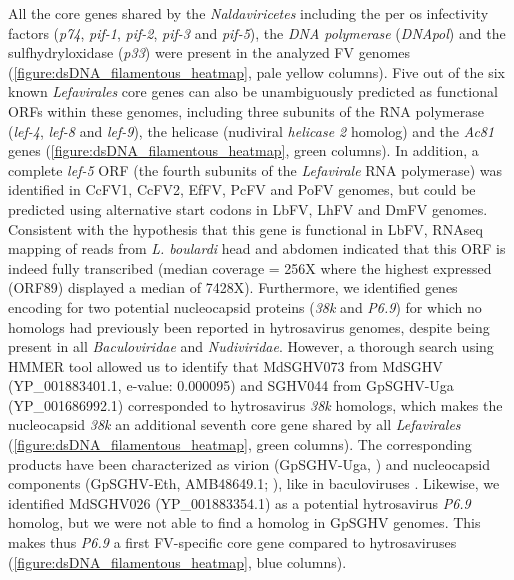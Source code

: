 All the core genes shared by the \textit{Naldaviricetes} including the per os infectivity factors (\textit{p74}, \textit{pif-1}, \textit{pif-2}, \textit{pif-3} and \textit{pif-5}), the \textit{DNA polymerase} (\textit{DNApol}) and the sulfhydryloxidase (\textit{p33}) were present in the analyzed FV genomes (\figurename{\ref{figure:dsDNA_filamentous_heatmap}}, pale yellow columns). Five out of the six known \textit{Lefavirales} core genes can also be unambiguously predicted as functional ORFs within these genomes, including three subunits of the RNA polymerase (\textit{lef-4}, \textit{lef-8} and \textit{lef-9}), the helicase (nudiviral \textit{helicase 2} homolog) and the \textit{Ac81} genes (\figurename{\ref{figure:dsDNA_filamentous_heatmap}}, green columns). In addition, a complete \textit{lef-5} ORF (the fourth subunits of the \textit{Lefavirale} RNA polymerase) was identified in CcFV1, CcFV2, EfFV, PcFV and PoFV genomes, but could be predicted using alternative start codons in LbFV, LhFV and DmFV genomes. Consistent with the hypothesis that this gene is functional in LbFV, RNAseq mapping of reads from \textit{L. boulardi} head and abdomen \citep{varaldi_deciphering_2018} indicated that this ORF is indeed fully transcribed (median coverage = 256X where the highest expressed (ORF89) displayed a median of 7428X). Furthermore, we identified genes encoding for two potential nucleocapsid proteins (\textit{38k} and \textit{P6.9}) for which no homologs had previously been reported in hytrosavirus genomes, despite being present in all \textit{Baculoviridae} and \textit{Nudiviridae}. However, a thorough search using HMMER tool allowed us to identify that MdSGHV073 from MdSGHV (YP\_001883401.1, e-value: 0.000095) and SGHV044 from GpSGHV-Uga (YP\_001686992.1) corresponded to hytrosavirus \textit{38k} homologs, which makes the nucleocapsid \textit{38k} an additional seventh core gene shared by all \textit{Lefavirales} (\figurename{\ref{figure:dsDNA_filamentous_heatmap}}, green columns).  The corresponding products have been characterized as virion (GpSGHV-Uga, \citep{kariithi_proteomic_2010}) and nucleocapsid components (GpSGHV-Eth, AMB48649.1; \citep{abd-alla_comprehensive_2016}), like in baculoviruses \citep{blissard_baculovirus_2018}. Likewise, we identified MdSGHV026 (YP\_001883354.1) as a potential hytrosavirus \textit{P6.9} homolog, but we were not able to find a homolog in GpSGHV genomes. This makes thus \textit{P6.9} a first FV-specific core gene compared to hytrosaviruses (\figurename{\ref{figure:dsDNA_filamentous_heatmap}}, blue columns).  

